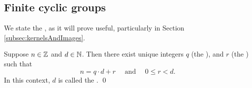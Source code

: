 \documentclass[../algebraNotesMSRI-UP2016.tex]{subfiles}
\begin{document}
\subsection[\subsecname]{Finite cyclic groups}
\begin{frame}[c]{\subsecname}{}
We state the , as it will prove useful, particularly in Section \ref{subsec:kernelsAndImages}.

\smallGap
\begin{thm}\label{thm:divisionAlgorithm}
Suppose $n\in\mathbb Z$ and $d\in\mathbb N$.  Then there exist unique integers $q$ (the ), and $r$ (the ) such that 
\begin{equation}\label{eq:divisionAlgorithm}
n = q\cdot d+r \quad\text{ and }\quad 0 \leq r < d.
\end{equation}
In this context, $d$ is called the .
\qed
\end{thm}
\end{frame}

%
\end{document}
